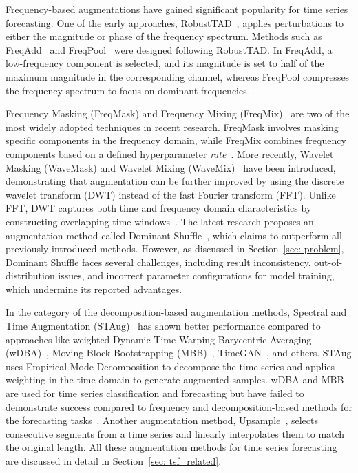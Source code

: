 Frequency-based augmentations have gained significant popularity for time series forecasting. One of the early approaches, RobustTAD~\cite{gao2021robusttadrobusttimeseries}, applies perturbations to either the magnitude or phase of the frequency spectrum. Methods such as FreqAdd~\cite{freqadd} and FreqPool~\cite{freqpool} were designed following RobustTAD. In FreqAdd, a low-frequency component is selected, and its magnitude is set to half of the maximum magnitude in the corresponding channel, whereas FreqPool compresses the frequency spectrum to focus on dominant frequencies~\cite{freqadd, freqpool}.

Frequency Masking (FreqMask) and Frequency Mixing (FreqMix)~\cite{chen2023fraugfrequencydomainaugmentation} are two of the most widely adopted techniques in recent research. FreqMask involves masking specific components in the frequency domain, while FreqMix combines frequency components based on a defined hyperparameter \textit{rate}~\cite{chen2023fraugfrequencydomainaugmentation}. More recently, Wavelet Masking (WaveMask) and Wavelet Mixing (WaveMix)~\cite{arabi2024wavemaskmixexploringwaveletbasedaugmentations} have been introduced, demonstrating that augmentation can be further improved by using the discrete wavelet transform (DWT) instead of the fast Fourier transform (FFT). Unlike FFT, DWT captures both time and frequency domain characteristics by constructing overlapping time windows~\cite{arabi2024wavemaskmixexploringwaveletbasedaugmentations}. The latest research proposes an augmentation method called Dominant Shuffle~\cite{zhao2024dominantshufflesimplepowerful}, which claims to outperform all previously introduced methods. However, as discussed in Section~\ref{sec: problem}, Dominant Shuffle faces several challenges, including result inconsistency, out-of-distribution issues, and incorrect parameter configurations for model training, which undermine its reported advantages.

In the category of the decomposition-based augmentation methods, Spectral and Time Augmentation (STAug)~\cite{zhang2023diversecoherentaugmentationtimeseries} has shown better performance compared to approaches like weighted Dynamic Time Warping Barycentric Averaging (wDBA)~\cite{asd}, Moving Block Bootstrapping (MBB)~\cite{BERGMEIR2016303}, TimeGAN~\cite{timegan}, and others. STAug uses Empirical Mode Decomposition to decompose the time series and applies weighting in the time domain to generate augmented samples. wDBA and MBB are used for time series classification and forecasting but have failed to demonstrate success compared to frequency and decomposition-based methods for the forecasting tasks~\cite{zhang2023diversecoherentaugmentationtimeseries, chen2023fraugfrequencydomainaugmentation}. Another augmentation method, Upsample~\cite{upsample}, selects consecutive segments from a time series and linearly interpolates them to match the original length. All these augmentation methods for time series forecasting are discussed in detail in Section~\ref{sec: tsf_related}.


